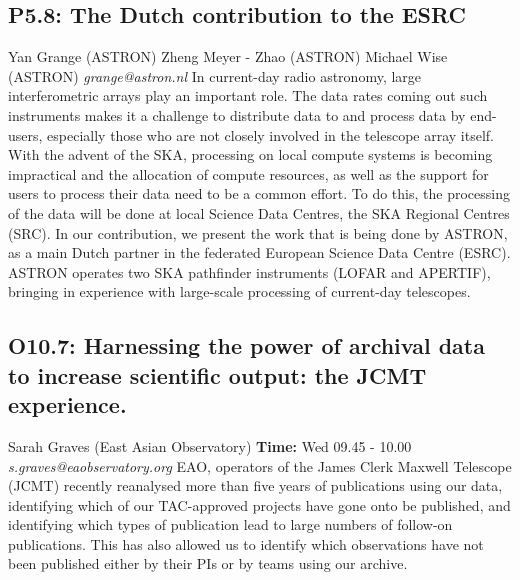 \documentclass{report}
\begin{document}
\subsection*{P5.8: The Dutch contribution to the ESRC}
\bigskip
Yan Grange (ASTRON) \newline Zheng Meyer - Zhao (ASTRON) \newline  Michael Wise (ASTRON)\newline   \newline  \newline  \newline\newline
{\it grange@astron.nl}\newline
\newline\newline
In current-day radio astronomy, large interferometric arrays play an important role. The data rates coming out such instruments makes it a challenge to distribute data to and process data by end-users, especially those who are not closely involved in the telescope array itself. 
With the advent of the SKA, processing on local compute systems is becoming impractical and the allocation of compute resources, as well as the support for users to process their data need to be a common effort. To do this, the processing of the data will be done at local Science Data Centres, the SKA Regional Centres (SRC).  
In our contribution, we present the work that is being done by ASTRON, as a main Dutch partner in the federated European Science Data Centre (ESRC). ASTRON operates two SKA pathfinder instruments (LOFAR and APERTIF), bringing in experience with large-scale processing of current-day telescopes.\newline
\newpage
\subsection*{O10.7: Harnessing the power of archival data to increase  scientific output: the JCMT experience.}
\bigskip
Sarah Graves (East Asian Observatory) \newline   \newline   \newline   \newline  \newline  \newline\newline
{\bf Time:} Wed 09.45 - 10.00\newline
\newline
{\it s.graves@eaobservatory.org}\newline
\newline\newline
EAO, operators of the James Clerk Maxwell Telescope (JCMT) recently
reanalysed more than five years of publications using our data,
identifying which of our TAC-approved projects have gone onto be
published, and identifying which types of publication lead to large
numbers of follow-on publications. This has also allowed us to identify
which observations have not been published either by their PIs or by teams using our archive.
\end{document}

